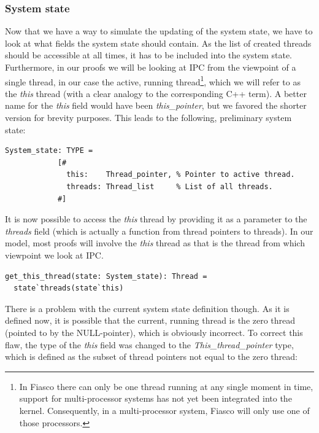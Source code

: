 \subsubsection{System state}
Now that we have a way to simulate the updating of the system state, we have to look at what fields the system state should contain. As the list of created threads should be accessible at all times, it has to be included into the system state. Furthermore, in our proofs we will be looking at IPC from the viewpoint of a single thread, in our case the active, running thread\footnote{In Fiasco there can only be one thread running at any single moment in time, support for multi-processor systems has not yet been integrated into the kernel. Consequently, in a multi-processor system, Fiasco will only use one of those processors.}, which we will refer to as the \emph{this} thread (with a clear analogy to the corresponding C++ term). A better name for the \emph{this} field would have been \emph{this\_pointer}, but we favored the shorter version for brevity purposes. This leads to the following, preliminary system state:

\lstset{language=PVS}
\begin{lstlisting}[caption={PVS: incomplete system state, focusing on threads.}]
System_state: TYPE = 
            [# 
              this:    Thread_pointer, % Pointer to active thread.
              threads: Thread_list     % List of all threads.
            #]
\end{lstlisting}

It is now possible to access the \emph{this} thread by providing it as a parameter to the \emph{threads} field (which is actually a function from thread pointers to threads). In our model, most proofs will involve the \emph{this} thread as that is the thread from which viewpoint we look at IPC.

\lstset{language=PVS}
\begin{lstlisting}[caption={PVS: example of accessing this thread.}]
% Return the this thread, which the <this> field of the system state points to.
get_this_thread(state: System_state): Thread = 
  state`threads(state`this)
\end{lstlisting}

There is a problem with the current system state definition though. As it is defined now, it is possible that the current, running thread is the zero thread (pointed to by the NULL-pointer), which is obviously incorrect. To correct this flaw, the type of the \emph{this} field was changed to the \emph{This\_thread\_pointer} type, which is defined as the subset of thread pointers not equal to the zero thread:

